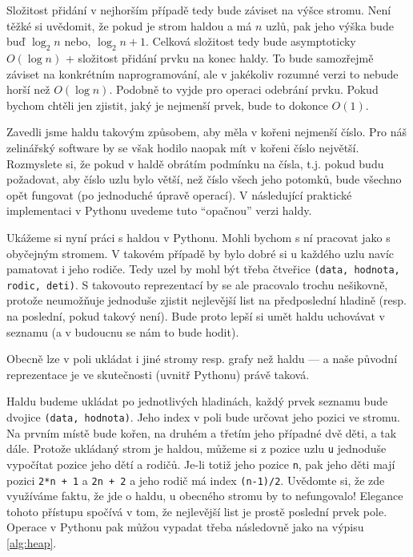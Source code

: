 Složitost přidání v nejhorším případě tedy bude záviset na výšce stromu. Není těžké si uvědomit, že pokud je strom haldou a má $n$
uzlů, pak jeho výška bude buď $\log_2 n$ nebo,  $\log_2 n + 1$. Celková složitost tedy bude asymptoticky $O(\log n)$ + složitost
přidání prvku na konec haldy. To bude samozřejmě záviset na konkrétním naprogramování, ale v jakékoliv rozumné verzi to nebude
horší než $O(\log n)$. Podobně to vyjde pro operaci odebrání prvku. Pokud bychom chtěli jen zjistit, jaký je nejmenší prvek,
bude to dokonce $O(1)$. 

Zavedli jsme haldu takovým způsobem, aby měla v kořeni nejmenší číslo. Pro náš zelinářský software by se však 
hodilo naopak mít v kořeni číslo největší. Rozmyslete si, že pokud v haldě obrátím podmínku na čísla, t.j. pokud budu požadovat,
aby číslo uzlu bylo větší, než číslo všech jeho potomků, bude všechno opět fungovat (po jednoduché úpravě operací). V následující
praktické implementaci v Pythonu uvedeme tuto ``opačnou'' verzi haldy.

Ukážeme si nyní práci s haldou v Pythonu. Mohli bychom s ní pracovat jako s obyčejným stromem. V takovém případě by bylo dobré si u každého
uzlu navíc pamatovat i jeho rodiče. Tedy uzel by mohl být třeba čtveřice {\tt (data, hodnota, rodic, deti)}. S takovouto reprezentací
by se ale pracovalo trochu nešikovně, protože neumožňuje jednoduše zjistit nejlevější list na předposlední hladině (resp. na poslední, pokud takový není).
Bude proto lepší si umět haldu uchovávat v seznamu (a v budoucnu se nám to bude hodit). 

\begin{todo}
Obecně lze v poli ukládat i jiné stromy resp. grafy než haldu --- a naše původní reprezentace je ve skutečnosti (uvnitř Pythonu)
právě taková.
\end{todo}

Haldu budeme ukládat po jednotlivých hladinách, každý prvek seznamu bude dvojice {\tt (data, hodnota)}. Jeho index v poli bude určovat jeho pozici ve stromu. 
Na prvním místě bude kořen, na druhém a třetím jeho případné dvě děti, a tak dále. Protože ukládaný strom je haldou, můžeme si z pozice uzlu {\tt u} jednoduše vypočítat
pozice jeho dětí a rodičů. Je-li totiž jeho pozice {\tt n}, pak jeho děti mají pozici {\tt 2*n + 1} a {\tt 2n + 2} a jeho rodič má index
{\tt (n-1)/2}. Uvědomte si, že zde využíváme faktu, že jde o haldu, u obecného stromu by to nefungovalo! Elegance tohoto přístupu spočívá v tom, 
že nejlevější list je prostě poslední prvek pole. Operace v Pythonu pak můžou vypadat třeba následovně jako na výpisu \ref{alg:heap}.

